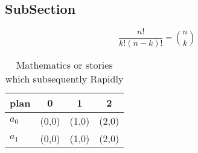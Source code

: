 \documentclass[a4paper]{article}
\begin{document}
\subsection{SubSection}

\[ \frac{n!}{k!(n-k)!} = \binom{n}{k} \]

\begin{table}
\begin{adjustbox}{width=0.6\columnwidth}
\begin{tabular}{|l|l|l|l|}
\hline
\textbf{plan} & \multicolumn{1}{c|}{\textbf{0}} & \multicolumn{1}{c|}{\textbf{1}} & \multicolumn{1}{c|}{\textbf{2}} \\ \hline
\textbf{$a_0$}  & (0,0) & (1,0) & (2,0) \\ \hline
\textbf{$a_1$}  & (0,0) & (1,0) & (2,0) \\ \hline
\end{tabular}
\end{adjustbox}
\caption{Mathematics or stories which subsequently Rapidly
}
\end{table}
\end{document}
